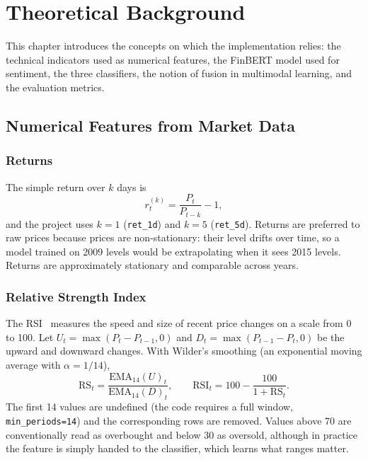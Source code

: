 \chapter{Theoretical Background}

This chapter introduces the concepts on which the implementation relies: the technical indicators used as numerical features, the FinBERT model used for sentiment, the three classifiers, the notion of fusion in multimodal learning, and the evaluation metrics.

\section{Numerical Features from Market Data}

\subsection{Returns}
The simple return over $k$ days is
\begin{equation}
r_t^{(k)} = \frac{P_t}{P_{t-k}} - 1,
\end{equation}
and the project uses $k=1$ (\texttt{ret\_1d}) and $k=5$ (\texttt{ret\_5d}). Returns are preferred to raw prices because prices are non-stationary: their level drifts over time, so a model trained on 2009 levels would be extrapolating when it sees 2015 levels. Returns are approximately stationary and comparable across years.

\subsection{Relative Strength Index}
The RSI~\cite{wilder1978new} measures the speed and size of recent price changes on a scale from 0 to 100. Let $U_t=\max(P_t-P_{t-1},0)$ and $D_t=\max(P_{t-1}-P_t,0)$ be the upward and downward changes. With Wilder's smoothing (an exponential moving average with $\alpha = 1/14$),
\begin{equation}
\mathrm{RS}_t = \frac{\mathrm{EMA}_{14}(U)_t}{\mathrm{EMA}_{14}(D)_t},
\qquad
\mathrm{RSI}_t = 100 - \frac{100}{1+\mathrm{RS}_t}.
\end{equation}
The first 14 values are undefined (the code requires a full window, \texttt{min\_periods=14}) and the corresponding rows are removed. Values above 70 are conventionally read as overbought and below 30 as oversold, although in practice the feature is simply handed to the classifier, which learns what ranges matter.

